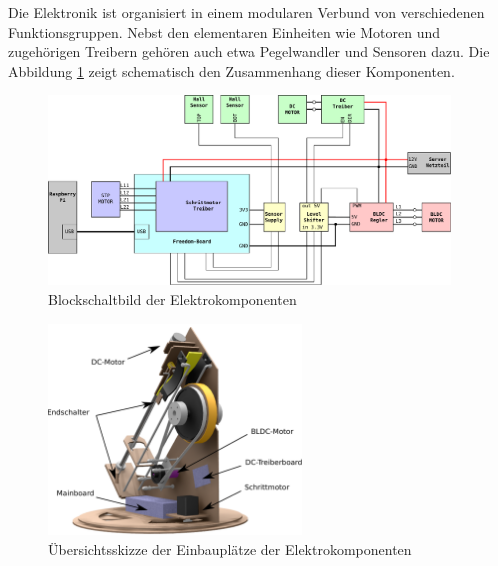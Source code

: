 
Die Elektronik ist organisiert in einem modularen Verbund von verschiedenen
Funktionsgruppen. Nebst den elementaren Einheiten wie Motoren und zugehörigen
Treibern gehören auch etwa Pegelwandler und Sensoren dazu. Die Abbildung
\ref{fig:et-block} zeigt schematisch den Zusammenhang dieser Komponenten.

\begin{figure}[h!]
	\centering
	\includegraphics[width=0.95\textwidth]{../../fig/blockdiagram.pdf}
	\caption{Blockschaltbild der Elektrokomponenten}
	\label{fig:et-block}
\end{figure}

\begin{figure}[h!]
	\centering
	\includegraphics[width=0.6\textwidth]{../../fig/et/overview.pdf}
	\caption{Übersichtsskizze der Einbauplätze der Elektrokomponenten}
\end{figure}
